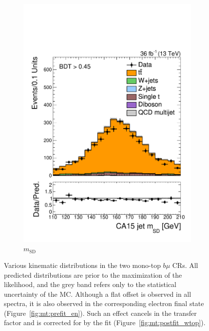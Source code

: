 \begin{figure}[]
\begin{center}
\begin{subfigure}[t]{0.32\textwidth}
            \includegraphics[width=\textwidth]{figures/monotop/prefit/singlemuontop_tight_fj1MSD.pdf}
            \caption{$m_\mathrm{SD}$}
        \end{subfigure}
        \caption{Various kinematic distributions in the two mono-top $b\mu$ CRs. 
                 All predicted distributions are prior to the maximization of the likelihood, and the grey band refers only to the statistical uncertainty of the MC.
                 Although a flat offset is observed in all spectra, it is also observed in the corresponding electron final state (Figure~\ref{fig:mt:prefit_en}).
                 Such an effect cancels in the transfer factor and is corrected for by the fit (Figure~\ref{fig:mt:postfit_wtop}).}
        \label{fig:mt:prefit_tmn}
    \end{center}
\end{figure}

